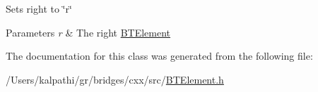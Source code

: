 Sets right to \char`\"{}r\char`\"{}
\begin{DoxyParams}{Parameters}
{\em r} & The right \mbox{\hyperlink{classbridges_1_1_b_t_element}{B\+T\+Element}} \\
\hline
\end{DoxyParams}


The documentation for this class was generated from the following file\+:\begin{DoxyCompactItemize}
\item 
/\+Users/kalpathi/gr/bridges/cxx/src/\mbox{\hyperlink{_b_t_element_8h}{B\+T\+Element.\+h}}\end{DoxyCompactItemize}
